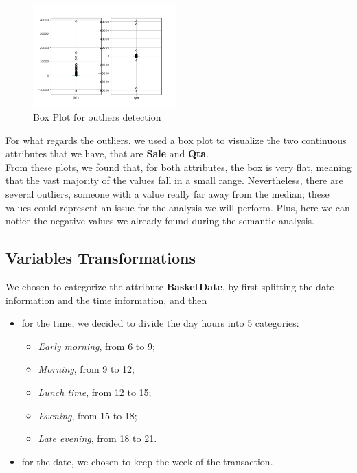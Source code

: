 \begin{figure}
\centering
\includegraphics[width=0.49\textwidth]{img/boxplot_before.png}
\caption{Box Plot for outliers detection}
\end{figure}

For what regards the outliers, we used a box plot to visualize the two continuous attributes that we have, that are \textbf{Sale} and \textbf{Qta}.\\
From these plots, we found that, for both attributes, the box is very flat, meaning that the vast majority of the values fall in a small range. Nevertheless, there are several outliers, someone with a value really far away from the median; these values could represent an issue for the analysis we will perform. Plus, here we can notice the negative values we already found during the semantic analysis.

\subsection{Variables Transformations}
We chosen to categorize the attribute \textbf{BasketDate}, by first splitting the date information and the time information, and then

\begin{itemize}
\item for the time, we decided to divide the day hours into 5 categories:
	\begin{itemize}
	\item \emph{Early morning}, from 6 to 9;
	\item \emph{Morning}, from 9 to 12;
	\item \emph{Lunch time}, from 12 to 15;
	\item \emph{Evening}, from 15 to 18;
	\item \emph{Late evening}, from 18 to 21.
	\end{itemize}
\item for the date, we chosen to keep the week of the transaction.
\end{itemize}

